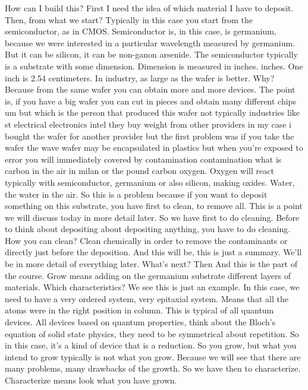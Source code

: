 How can I build this? First I need the idea of which material I have to deposit. Then, from what we start? Typically in this case you start from the semiconductor, as in CMOS. Semiconductor is, in this case, is germanium, because we were interested in a particular wavelength measured by germanium. But it can be silicon, it can be non-ganon arsenide. The semiconductor typically is a substrate with some dimension. Dimension is measured in inches. inches. One inch is 2.54 centimeters. In industry, as large as the wafer is better. Why? Because from the same wafer you can obtain more and more devices. The point is, if you have a big wafer you can cut in pieces and obtain many different chips um but which is the person that produced this wafer not typically industries like st electrical electronics intel they buy weight from other providers in my case i bought the wafer for another provider but the first problem was if you take the wafer the wave wafer may be encapsulated in plastics but when you're exposed to error you will immediately covered by contamination contamination what is carbon in the air in milan or the pound carbon oxygen. Oxygen will react typically with semiconductor, germanium or also silicon, making oxides. Water, the water in the air. So this is a problem because if you want to deposit something on this substrate, you have first to clean, to remove all. This is a point we will discuss today in more detail later. So we have first to do cleaning. Before to think about depositing about depositing anything, you have to do cleaning. How you can clean? Clean chemically in order to remove the contaminants or directly just before the deposition. And this will be, this is just a summary. We'll be in more detail of everything later. What's next? Then And this is the part of the course. Grow means adding on the germanium substrate different layers of materials. Which characteristics? We see this is just an example. In this case, we need to have a very ordered system, very epitaxial system. Means that all the atoms were in the right position in column. This is typical of all quantum devices. All devices based on quantum properties, think about the Bloch's equation of solid state physics, they need to be symmetrical about repetition. So in this case, it's a kind of device that is a reduction. So you grow, but what you intend to grow typically is not what you grow. Because we will see that there are many problems, many drawbacks of the growth. So we have then to characterize. Characterize means look what you have grown.
